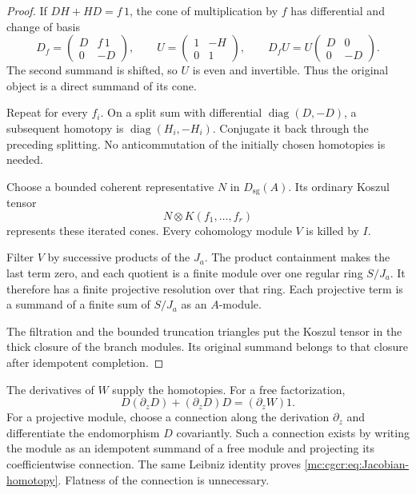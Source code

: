 \begin{proof}
If $DH+HD=f\,1$, the cone of multiplication by $f$ has
differential and change of basis
\begin{equation}\label{mc:cgcr:eq:cone}
 D_f=\begin{pmatrix}D&f\,1\\0&-D\end{pmatrix},
 \qquad U=\begin{pmatrix}1&-H\\0&1\end{pmatrix},
 \qquad D_fU=U\begin{pmatrix}D&0\\0&-D\end{pmatrix}.
\end{equation}
The second summand is shifted, so $U$ is even and invertible.
Thus the original object is a direct summand of its cone.

Repeat for every $f_i$. On a split sum with differential
$\operatorname{diag}(D,-D)$, a subsequent homotopy is
$\operatorname{diag}(H_i,-H_i)$. Conjugate it back through
the preceding splitting. No anticommutation of the initially
chosen homotopies is needed.

Choose a bounded coherent representative $N$ in
$D_{\mathrm{sg}}(A)$. Its ordinary Koszul tensor
\[
 N\otimes K(f_1,\ldots,f_r)
\]
represents these iterated cones.
Every cohomology module $V$ is killed by $I$.

Filter $V$ by successive products of the $J_a$.
The product containment makes the last term zero, and
each quotient is a finite module over one regular ring
$S/J_a$. It therefore has a finite projective resolution
over that ring. Each projective term is a summand of a
finite sum of $S/J_a$ as an $A$-module.

The filtration and the bounded truncation triangles put
the Koszul tensor in the thick closure of the branch
modules. Its original summand belongs to that closure
after idempotent completion.
\end{proof}

The derivatives of $W$ supply the homotopies. For a free
factorization,
\begin{equation}\label{mc:cgcr:eq:Jacobian-homotopy}
 D(\partial_zD)+(\partial_zD)D=(\partial_zW)1.
\end{equation}
For a projective module, choose a connection along the
derivation $\partial_z$ and differentiate the endomorphism
$D$ covariantly. Such a connection exists by writing the
module as an idempotent summand of a free module and
projecting its coefficientwise connection. The same
Leibniz identity proves \eqref{mc:cgcr:eq:Jacobian-homotopy}.
Flatness of the connection is unnecessary.

